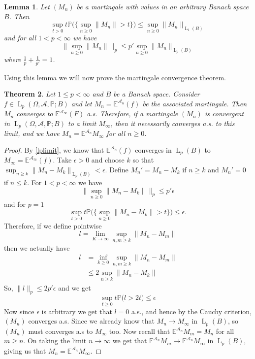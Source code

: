 \documentclass[]{report}
\newcommand{\lp}[2]{\operatorname{L}_{#1}({#2})}
\newcommand*{\Normb}[2]{\lVert {#1} \rVert_{#2}}
\newcommand*{\Normu}[1]{\lVert {#1} \rVert}
\renewcommand{\P}[1]{\mathbb{P}\big({#1}\big)}
\newcommand{\pspc}{\Omega,\mathcal{A},\mathbb{P}}
\newcommand*{\extop}[1]{\mathbb{E}^{{#1}}}
\newtheorem{theorem}{Theorem}[chapter]
\newtheorem{lemma}[theorem]{Lemma}
\begin{document}
\begin{lemma} \label{doobB}
	Let $(M_n)$ be a martingale with values in an arbitrary Banach space $B$. Then \[ \sup_{t>0}t\P{\{\sup_{n\geq0}\Normu{M_n} >t\}} \leq \sup_{n\geq0}\Normb{M_n}{\lp{1}{B}} \]
	and for all $1 < p <\infty$ we have 
	\[ \Normb{\sup_{n\geq0}\Normu{M_n}}{p} \leq p'\sup_{n\geq0}\Normb{M_n}{\lp{p}{B}} \] where $\frac{1}{p}+\frac{1}{p'}=1$.
\end{lemma}

Using this lemma we will now prove the martingale convergence theorem.

\begin{theorem}\label{MCT}
	Let $1\leq p < \infty$ and $B$ be a Banach space. Consider $f \in \lp{p}{\pspc;B}$ and let $M_n=\extop{\mathcal{A}_n}(f)$ be the associated martingale. Then $M_n$ converges to $\extop{\mathcal{A}_{\infty}}(F)$ a.s. Therefore, if a martingale $(M_n)$ is convergent in $\lp{p}{\pspc;B}$ to a limit $M_{\infty}$, then it necessarily converges a.s. to this limit, and we have $M_n=\extop{\mathcal{A}_n}M_{\infty}$ for all $n \geq 0$.
\end{theorem}
\begin{proof}
	By \ref{lplimit}, we know that $\extop{\mathcal{A}_n}(f)$ converges in $\lp{p}{B}$ to $M_{\infty} = \extop{\mathcal{A}_{\infty}}(f)$. Take $\epsilon>0$ and choose $k$ so that $\sup_{n\geq k}\Normb{M_n-M_k}{\lp{p}{B}}< \epsilon$. Define $M_n'=M_n-M_k$ if $n\geq k$ and $M_n'=0$ if $n\leq k$. For $1<p<\infty$ we have 
	\[ \Normb{\sup_{n\geq0}\Normu{M_n-M_k}}{p} \leq p'\epsilon \]
	and for $p=1$ \[ \sup_{t>0}t\P{\{\sup_{n\geq0}\Normu{M_n-M_k} >t\}} \leq \epsilon .\]
	Therefore, if we define pointwise 
	\[ l= \lim\limits_{K\rightarrow \infty}\sup\limits_{n,m\geq k}\Normu{M_n-M_m} \] 
	then we actually have 
	\[ \begin{aligned}
		l&= \inf\limits_{k\geq 0}\sup\limits_{n,m\geq k}\Normu{M_n-M_m}\\
		&\leq 2 \sup\limits_{n\geq k}\Normu{M_n-M_k}
	\end{aligned} \]
	So, $\Normb{l}{p}\leq 2p'\epsilon$ and we get
	\[ \sup\limits_{t\geq 0} t \P{l>2t}\leq \epsilon \]
	Now since $\epsilon$ is arbitrary we get that $l=0$ a.s., and hence by the Cauchy criterion, $(M_n)$ converges a.s. Since we already know that $M_n \rightarrow M_{\infty}$ in $\lp{p}{B}$, so $(M_n)$ must converges a.s to $M_{\infty}$ too. Now recall that $\extop{\mathcal{A}_n}M_m=M_n$ for all $m\geq n$. On taking the limit $n\rightarrow \infty$ we get that $\extop{\mathcal{A}_n}M_m \rightarrow \extop{\mathcal{A}_n}M_{\infty}$ in $\lp{p}{B}$, giving us that $M_n=\extop{\mathcal{A}_n}M_{\infty}$. 
\end{proof}
\end{document}
